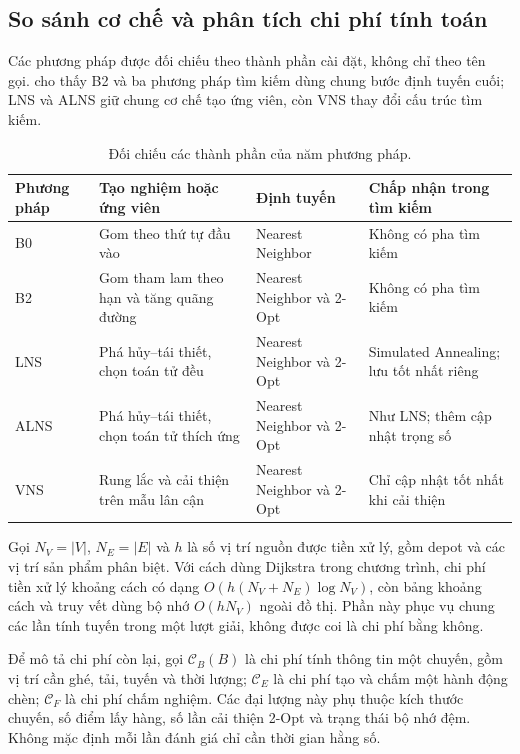 \subsection{So sánh cơ chế và phân tích chi phí tính toán}
Các phương pháp được đối chiếu theo thành phần cài đặt, không chỉ theo tên gọi.  cho thấy B2 và ba phương pháp tìm kiếm dùng chung bước định tuyến cuối; LNS và ALNS giữ chung cơ chế tạo ứng viên, còn VNS thay đổi cấu trúc tìm kiếm.

\begin{table}[H]
\centering\small
\begin{tabularx}{\linewidth}{lXXX}
\toprule
Phương pháp & Tạo nghiệm hoặc ứng viên & Định tuyến & Chấp nhận trong tìm kiếm \\
\midrule
B0 & Gom theo thứ tự đầu vào & Nearest Neighbor & Không có pha tìm kiếm \\
B2 & Gom tham lam theo hạn và tăng quãng đường & Nearest Neighbor và 2-Opt & Không có pha tìm kiếm \\
LNS & Phá hủy--tái thiết, chọn toán tử đều & Nearest Neighbor và 2-Opt & Simulated Annealing; lưu tốt nhất riêng \\
ALNS & Phá hủy--tái thiết, chọn toán tử thích ứng & Nearest Neighbor và 2-Opt & Như LNS; thêm cập nhật trọng số \\
VNS & Rung lắc và cải thiện trên mẫu lân cận & Nearest Neighbor và 2-Opt & Chỉ cập nhật tốt nhất khi cải thiện \\
\bottomrule
\end{tabularx}
\caption{Đối chiếu các thành phần của năm phương pháp.}\label{tab:method-mechanisms}
\end{table}

Gọi $N_V=|V|$, $N_E=|E|$ và $h$ là số vị trí nguồn được tiền xử lý, gồm depot và các vị trí sản phẩm phân biệt. Với cách dùng Dijkstra trong chương trình, chi phí tiền xử lý khoảng cách có dạng $O(h(N_V+N_E)\log N_V)$, còn bảng khoảng cách và truy vết dùng bộ nhớ $O(hN_V)$ ngoài đồ thị. Phần này phục vụ chung các lần tính tuyến trong một lượt giải, không được coi là chi phí bằng không.

Để mô tả chi phí còn lại, gọi $\mathcal C_B(B)$ là chi phí tính thông tin một chuyến, gồm vị trí cần ghé, tải, tuyến và thời lượng; $\mathcal C_E$ là chi phí tạo và chấm một hành động chèn; $\mathcal C_F$ là chi phí chấm nghiệm. Các đại lượng này phụ thuộc kích thước chuyến, số điểm lấy hàng, số lần cải thiện 2-Opt và trạng thái bộ nhớ đệm. Không mặc định mỗi lần đánh giá chỉ cần thời gian hằng số.

